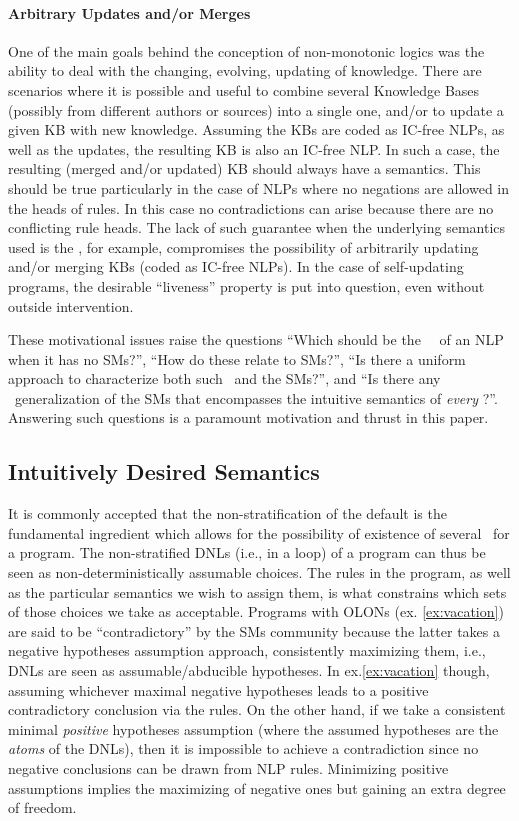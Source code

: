 \documentclass{llncs}
\begin{document}
		\paragraph{{\bf Arbitrary Updates and/or Merges}}\label{subsec:allowingArbitraryUpdatesMerges}
			One of the main goals behind the conception of non-monotonic logics was the ability to deal with the changing, evolving, updating of 
			knowledge.
			There are scenarios where it is possible and useful to combine several Knowledge Bases (possibly from different authors or sources) into a 
			single one, and/or to update a given KB with new knowledge. Assuming the KBs are coded as IC-free NLPs, as well as the updates, the resulting KB is also an IC-free NLP.
			In such a case, the resulting (merged and/or updated) KB should always have a semantics.
			This should be true particularly in the case of NLPs where no negations are allowed in the heads of rules.
			In this case no contradictions can arise because there are no conflicting rule heads.
			The lack of such guarantee when the underlying semantics used is the \SMs, for example, compromises the possibility of arbitrarily
			updating and/or merging KBs (coded as IC-free NLPs).
			In the case of self-updating programs, the desirable ``liveness'' property is put into question, even without outside intervention.
	
			These motivational issues raise the questions
``Which should be the \twov\ \ms\ of an NLP when it has no SMs?'',
			``How do these relate to SMs?'',
			``Is there a uniform approach to characterize both such \ms\ and the SMs?'', and 
			``Is there any \twov\ generalization of the SMs that encompasses the intuitive semantics of \emph{every} \lp?''.
			Answering such questions is a paramount motivation and thrust in this paper.
		\subsection{Intuitively Desired Semantics}\label{subsec:intuitivelydesired}
			It is commonly accepted that the non-stratification of the default  is the fundamental ingredient which allows for the possibility of 
			existence of several \ms\ for a program. The non-stratified DNLs (i.e., in a loop) of a program can thus be seen as non-deterministically assumable choices.
			The rules in the program, as well as the particular semantics we wish to assign them, is what constrains which sets of those choices
			we take as acceptable.
			Programs with OLONs (ex. \ref{ex:vacation}) are said to be
			``contradictory'' by the SMs community because the latter takes a negative hypotheses assumption approach,
			consistently maximizing them,
			i.e., DNLs are seen as assumable/abducible hypotheses.
			In ex.\ref{ex:vacation} though, assuming whichever maximal negative hypotheses leads to a positive contradictory
			conclusion via the rules.
			On the other hand, if we take a consistent minimal \emph{positive} hypotheses assumption (where the assumed
			hypotheses are the \emph{atoms} of the DNLs), then it is impossible to achieve a
			contradiction since no negative conclusions can be drawn from NLP rules.
			Minimizing positive assumptions implies the maximizing of negative ones but gaining an extra degree of freedom.
\end{document}
